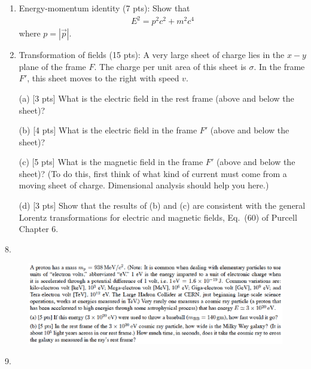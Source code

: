\begin{enumerate}
\item Energy-momentum identity (7 pts): Show that
\begin{eqnarray*}
E^2 = p^2 c^2 + m^2 c^4
\end{eqnarray*}
where $p = |\vec p|$.


\newpage


\item Transformation of fields (15 pts): A very large sheet of charge
lies in the $x-y$ plane of the frame $F$.  The charge per unit area of
this sheet is $\sigma$.  In the frame $F'$, this sheet moves to the
right with speed $v$.

\par\noindent (a) [3 pts] What is the electric field in the rest
frame (above and below the sheet)?

\par\noindent (b) [4 pts] What is the electric field in the frame $F'$
(above and below the sheet)?

\par\noindent (c) [5 pts] What is the magnetic field in the frame $F'$
(above and below the sheet)?  (To do this, first think of what kind of
current must come from a moving sheet of charge.  Dimensional analysis
should help you here.)

\par\noindent (d) [3 pts] Show that the results of (b) and (c) are
consistent with the general Lorentz transformations for electric and
magnetic fields, Eq.\ (60) of Purcell Chapter 6.

\end{enumerate}

\newpage

8.

\begin{figure}[h!]
\begin{center}
\includegraphics[width = 12cm]{cosmic_rays.eps}
\end{center}
\end{figure}

9.


